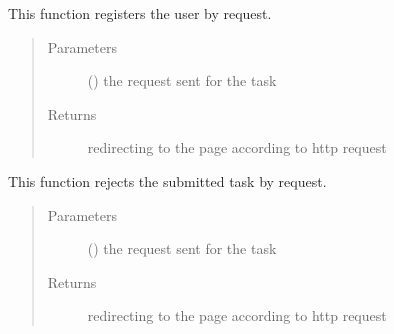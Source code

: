 \documentclass[letterpaper,10pt,english]{sphinxmanual}
\begin{document}
\begin{fulllineitems}
\label{\detokenize{janta:janta.views.register}}
This function registers the user by request.
\begin{quote}\begin{description}
\item[{Parameters}] \leavevmode
{} () \textendash{} the request sent for the task

\item[{Returns}] \leavevmode
redirecting to the page according to http request

\end{description}\end{quote}

\end{fulllineitems}


\begin{fulllineitems}
\label{\detokenize{janta:janta.views.reject_submission}}
This function rejects the submitted task by request.
\begin{quote}\begin{description}
\item[{Parameters}] \leavevmode
{} () \textendash{} the request sent for the task

\item[{Returns}] \leavevmode
redirecting to the page according to http request

\end{description}\end{quote}

\end{fulllineitems}

\end{document}
